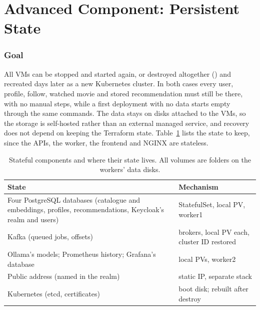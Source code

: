 \section{Advanced Component: Persistent State}\label{sec:advanced}

\subsubsection{Goal} All VMs can be stopped and started again, or destroyed altogether () and recreated days later as a new Kubernetes cluster. In both cases every user, profile, follow, watched movie and stored recommendation must still be there, with no manual steps, while a first deployment with no data starts empty through the same commands. The data stays on disks attached to the VMs, so the storage is self-hosted rather than an external managed service, and recovery does not depend on keeping the Terraform state. Table~\ref{tab:state} lists the state to keep, since the APIs, the worker, the frontend and NGINX are stateless.

\begin{table}[t]\centering\footnotesize
\caption{Stateful components and where their state lives. All volumes are folders on the workers' data disks.}\label{tab:state}
\begin{tabularx}{\columnwidth}{@{}>{\raggedright\arraybackslash}X>{\raggedright\arraybackslash}p{3.1cm}@{}}
\toprule
\textbf{State} & \textbf{Mechanism}\\
\midrule
Four PostgreSQL databases (catalogue and embeddings, profiles, recommendations, Keycloak's realm and users) & StatefulSet, local PV, worker1\\
Kafka (queued jobs, offsets) & 3 brokers, local PV each, cluster ID restored\\
Ollama's models; Prometheus history; Grafana's database & local PVs, worker2\\
Public address (named in the realm) & static IP, separate stack\\
Kubernetes (etcd, certificates) & boot disk; rebuilt after destroy\\
\bottomrule
\end{tabularx}
\end{table}

